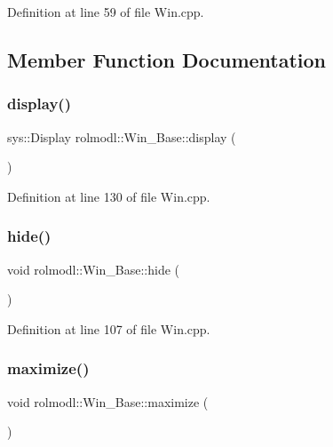 Definition at line 59 of file Win.\+cpp.



\subsection{Member Function Documentation}
\mbox{\label{classrolmodl_1_1_win___base_ad93474759ca3be7601135a7159b6c533}} 
\subsubsection{\texorpdfstring{display()}{display()}}
{\footnotesize\ttfamily sys\+::\+Display rolmodl\+::\+Win\+\_\+\+Base\+::display (\begin{DoxyParamCaption}{ }\end{DoxyParamCaption})}



Definition at line 130 of file Win.\+cpp.

\mbox{\label{classrolmodl_1_1_win___base_a65c3f53e955261a2d7a864e9295b2375}} 
\subsubsection{\texorpdfstring{hide()}{hide()}}
{\footnotesize\ttfamily void rolmodl\+::\+Win\+\_\+\+Base\+::hide (\begin{DoxyParamCaption}{ }\end{DoxyParamCaption})\hspace{0.3cm}{\ttfamily [noexcept]}}



Definition at line 107 of file Win.\+cpp.

\mbox{\label{classrolmodl_1_1_win___base_a03bf213c7451e5c16fd903a9f498a46d}} 
\subsubsection{\texorpdfstring{maximize()}{maximize()}}
{\footnotesize\ttfamily void rolmodl\+::\+Win\+\_\+\+Base\+::maximize (\begin{DoxyParamCaption}{ }\end{DoxyParamCaption})\hspace{0.3cm}{\ttfamily [noexcept]}}



